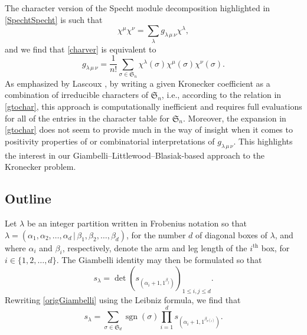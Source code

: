 \documentclass[12pt]{article}
\begin{document}
 The character version of the Specht module decomposition highlighted in \eqref{SpechtSpecht} is such that 
\begin{equation}\label{charver}
 \chi^{\mu} \chi^{\nu} = \sum_{\lambda} g_{\lambda \, \mu \, \nu} \chi^{\lambda}, 
\end{equation}
 and we find that \eqref{charver} is equivalent to 
\begin{equation}\label{gtochar}
 g_{\lambda \, \mu \, \nu} = \frac{1}{n!} \sum_{\sigma \in \mathfrak{S}_{n}} \chi^{\lambda}(\sigma) \chi^{\mu}(\sigma) \chi^{\nu}(\sigma). 
\end{equation}
 As emphasized by Lascoux \cite{Lascoux1980}, by writing a given Kronecker coefficient as a combination of irreducible characters of 
 $\mathfrak{S}_{n}$, i.e., according to the relation in \eqref{gtochar}, this approach is computationally inefficient and requires full 
 evaluations for all of the entries in the character table for $\mathfrak{S}_{n}$. Moreover, the expansion in \eqref{gtochar} does not seem to provide 
 much in the way of insight when it comes to positivity properties of or combinatorial interpretations of $g_{\lambda \, \mu \, \nu}$. 
 This highlights the interest in our Giambelli--Littlewood--Blasiak-based approach to the Kronecker problem.

\subsection{Outline}\label{secFrame}
 Let $\lambda$ be an integer partition written in Frobenius notation so that $\lambda = (\alpha_1, \alpha_2, \ldots, \alpha_d \, | \, \beta_1, 
 \beta_2, \ldots, \beta_d)$, for the number $d$ of diagonal boxes of $\lambda$, and where $\alpha_i$ and $\beta_i$, respectively, denote 
 the arm and leg length of the $i^{\text{th}}$ box, for $i \in \{ 1, 2, \ldots, d \}$. The Giambelli identity may then be formulated so that 
\begin{equation}\label{origGiambelli}
 s_{\lambda} = \det\left( s_{\left( \alpha_i + 1, 1^{\beta_j} \right) } \right)_{1 \leq i, j \leq d}. 
\end{equation} 
 Rewriting \eqref{origGiambelli} using the Leibniz formula, we find that 
\begin{equation}\label{rewriteGiambelli}
 s_{\lambda} = \sum_{\sigma \in \mathfrak{S}_{d}} \operatorname{sgn}(\sigma) \prod_{i=1}^{d} s_{\left( \alpha_i + 1, 1^{\beta_{\sigma(i)}} \right)}. 
\end{equation}
\end{document}
